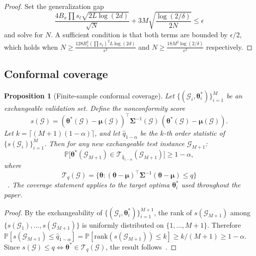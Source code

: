 \documentclass[aps,prx,reprint,superscriptaddress,longbibliography]{revtex4-2}
\newcommand{\calG}{\mathcal{G}}
\newcommand{\calT}{\mathcal{T}}
\newcommand{\bbP}{\mathbb{P}}
\newtheorem{proposition}[theorem]{Proposition}
\begin{document}
\begin{proof}
Set the generalization gap
\begin{equation*}
    \frac{4 B_x \prod s_\ell \sqrt{2L\log(2d)}}{\sqrt{N}}
    + 3M\sqrt{\frac{\log(2/\delta)}{2N}}
    \le \epsilon
\end{equation*}
and solve for $N$.
A sufficient condition is that both terms are bounded by $\epsilon/2$, which holds when
$N \ge \frac{128 B_x^2 (\prod s_\ell)^2 L \log(2d)}{\epsilon^2}$
and $N \ge \frac{18 M^2 \log(2/\delta)}{\epsilon^2}$
respectively.
\end{proof}

\subsection{Conformal coverage}

\begin{proposition}[Finite-sample conformal coverage]
\label{prop:conformal}
Let $\{(\calG_i, \bm\theta^*_i)\}_{i=1}^M$ be an exchangeable
validation set.  Define the nonconformity score
\begin{equation*}
    s(\calG)
    = (\bm\theta^*(\calG) - \bm\mu(\calG))^\top
    \bm\Sigma^{-1}(\calG)\,(\bm\theta^*(\calG) - \bm\mu(\calG)).
\end{equation*}
Let $k = \lceil(M+1)(1-\alpha)\rceil$, and let
$\hat{q}_{1-\alpha}$ be the $k$-th order statistic of
$\{s(\calG_i)\}_{i=1}^M$. Then for any new exchangeable test
instance $\calG_{M+1}$:
\begin{equation}
    \bbP\bigl[\bm\theta^*(\calG_{M+1}) \in
    \calT_{\hat{q}_{1-\alpha}}(\calG_{M+1})\bigr] \ge 1 - \alpha,
    \label{eq:conformal_coverage}
\end{equation}
where
\begin{equation*}
    \calT_q(\calG)
    = \bigl\{\bm\theta :
    (\bm\theta - \bm\mu)^\top \bm\Sigma^{-1}(\bm\theta - \bm\mu)
    \le q\bigr\}
\end{equation*}
~\cite{vovk2005,romano2019,angelopoulos2021}.
The coverage statement applies to the target optima $\bm\theta_i^*$
used throughout the paper.
\end{proposition}

\begin{proof}
By the exchangeability of $\{(\calG_i,\bm\theta^*_i)\}_{i=1}^{M+1}$,
the rank of $s(\calG_{M+1})$ among
$\{s(\calG_1),\ldots,s(\calG_{M+1})\}$ is uniformly distributed
on $\{1,\ldots,M+1\}$.  Therefore
$\bbP[s(\calG_{M+1}) \le \hat{q}_{1-\alpha}]
= \bbP[\mathrm{rank}(s(\calG_{M+1})) \le k]
\ge k/(M+1) \ge 1-\alpha$.
Since $s(\calG) \le q \Leftrightarrow
\bm\theta^* \in \calT_q(\calG)$,
the result follows~\cite{vovk2005,angelopoulos2021}.
\end{proof}
\end{document}
